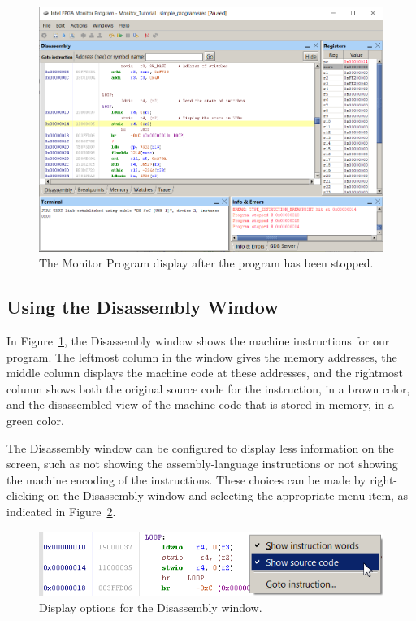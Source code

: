 \documentclass[11pt, twoside, pdftex]{article}
\begin{document}
\begin{figure}[H]
   \begin{center}
      \includegraphics[scale=0.6]{screenshots/figure15.png}
   \end{center}
   \caption{The Monitor Program display after the program has been stopped.} 
	 \label{fig:15}
\end{figure}


\subsection{Using the Disassembly Window}

In Figure~\ref{fig:15}, the Disassembly window shows the machine
instructions for our program.
The leftmost column in the window gives the memory addresses,
the middle column displays the machine code at these addresses,
and the rightmost column shows both the original source code for
the instruction, in a brown color, and the disassembled view of
the machine code that is stored in memory, in a green color.

The Disassembly window can be configured to display less information on the screen, such as 
not showing the assembly-language instructions or not showing the machine encoding of the instructions. These choices can 
be made by right-clicking on the Disassembly window and selecting
the appropriate menu item, as indicated in Figure~\ref{fig:16}.

\begin{figure}[H]
   \begin{center}
      \includegraphics[scale=1]{screenshots/figure16.png}
   \end{center}
   \caption{Display options for the Disassembly window.} 
	 \label{fig:16}
\end{figure}
\end{document}
